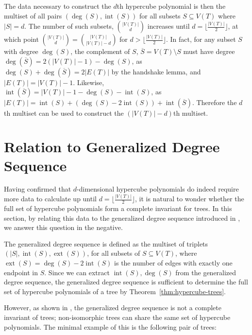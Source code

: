 \documentclass[12pt,reqno,dvipsnames]{amsart}
\theoremstyle{definition}
\newcommand{\Int}{\operatorname{int}}
\newcommand{\Ext}{\operatorname{ext}}
\begin{document}
The data necessary to construct the $d$th hypercube polynomial is then the multiset of all pairs $(\deg(S),\Int(S))$ for all subsets $S\subseteq V(T)$ where $|S|=d$. The number of such subsets, $\binom{|V(T)|}{d}$ increases until $d=\lfloor\frac{|V(T)|}{2}\rfloor$, at which point $\binom{|V(T)|}{d}=\binom{|V(T)|}{|V(T)|-d}$ for $d>\lfloor\frac{|V(T)|}{2}\rfloor$. In fact, for any subset $S$ with degree $\deg(S)$, the complement of $S$, $\overline{S}=V(T)\setminus S$ must have degree $\deg(\overline{S})=2\left(|V(T)|-1\right)-\deg(S)$, as $\deg(S)+\deg(\overline{S})=2|E(T)|$ by the handshake lemma, and $|E(T)|=|V(T)|-1$. Likewise, $\Int(\overline{S})=|V(T)|-1-\deg(S)-\Int(S)$, as $|E(T)|=\Int(S)+(\deg(S)-2\Int(S))+\Int(\overline{S})$. Therefore the $d$th multiset can be used to construct the $(|V(T)|-d)$th multiset.

\section{Relation to Generalized Degree Sequence}\label{sec:gen-deg-seq}
Having confirmed that $d$-dimensional hypercube polynomials do indeed require more data to calculate up until $d=\lfloor\frac{|V(T)|}{2}\rfloor$, it is natural to wonder whether the full set of hypercube polynomials form a complete invariant for trees. In this section, by relating this data to the generalized degree sequence introduced in \cite{Cre20}, we answer this question in the negative. 

The generalized degree sequence is defined as the multiset of triplets $(|S|, \Int(S), \Ext(S))$, for all subsets of $S\subseteq V(T)$, where $\Ext(S) = \deg(S) - 2 \Int(S)$ is the number of edges with exactly one endpoint in $S$. Since we can extract $\Int(S),\deg(S)$ from the generalized degree sequence, the generalized degree sequence is sufficient to determine the full set of hypercube polynomials of a tree by Theorem~\ref{thm:hypercube-trees}.

However, as shown in \cite{Cre20}, the generalized degree sequence is not a complete invariant of trees; non-isomorphic trees can share the same set of hypercube polynomials. The minimal example of this is the following pair of trees:
\end{document}
